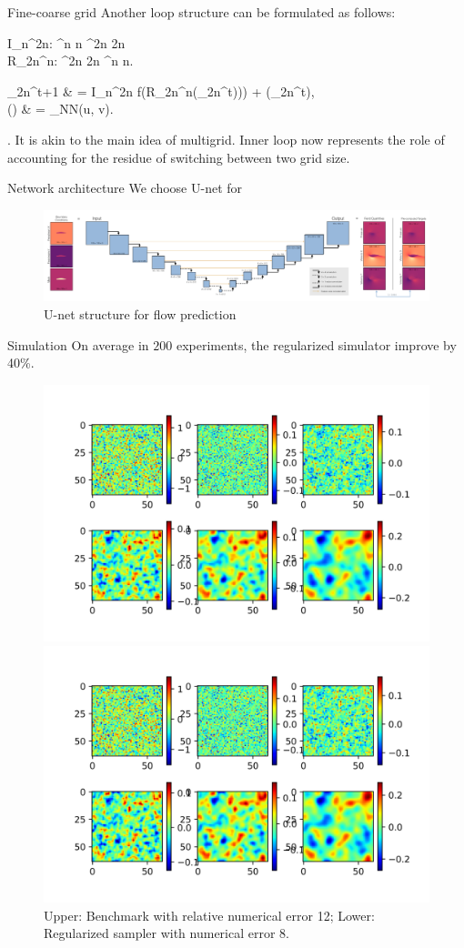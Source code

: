 \documentclass{beamer}
\begin{document}
\begin{frame}{Fine-coarse grid}
	Another loop structure can be formulated as follows:
	\bequn
	\begin{aligned}
	I_n^{2n}: \mbR^{n \times n} \rightarrow \mbR^{2n \times 2n}			\\
	R_{2n}^{n}: \mbR^{2n \times 2n} \rightarrow \mbR^{n \times n}.
	\end{aligned}
\eequn
	\bequ
	\lbb\begin{aligned}
		\mfu_{2n}^{t+1} & = I_n^{2n} \circ f(R_{2n}^{n}(\mfu_{2n}^t))) + \wht \mfR(\mfu_{2n}^t),		\\
		\wht \mfR(\mfu) & = \phi_{NN}(u, v).
	\end{aligned}\right.
\eequ
	It is akin to the main idea of multigrid. Inner loop now represents the role of accounting for the residue of switching between two grid size.
\end{frame}


\begin{frame}{Network architecture}
	We choose U-net for 
	\begin{figure}[H]
          \centering
          \centerline{\includegraphics[width=1.1\linewidth]{fig/Unet.png}}
          \caption{U-net structure for flow prediction\footnotemark}
\end{figure}
\end{frame}


\begin{frame}{Simulation}
	On average in $200$ experiments, the regularized simulator improve by 40\%.
	\begin{figure}[H]
          \centering
          \centerline{\includegraphics[width=0.4\linewidth]{fig/RD2-64-bm.jpg}}
          \centerline{\includegraphics[width=0.4\linewidth]{fig/RD2-64-reg.jpg}}
          \caption{Upper: Benchmark with relative numerical error 12; Lower: Regularized sampler with numerical error 8.}
\end{figure}
\end{frame}
\end{document}
